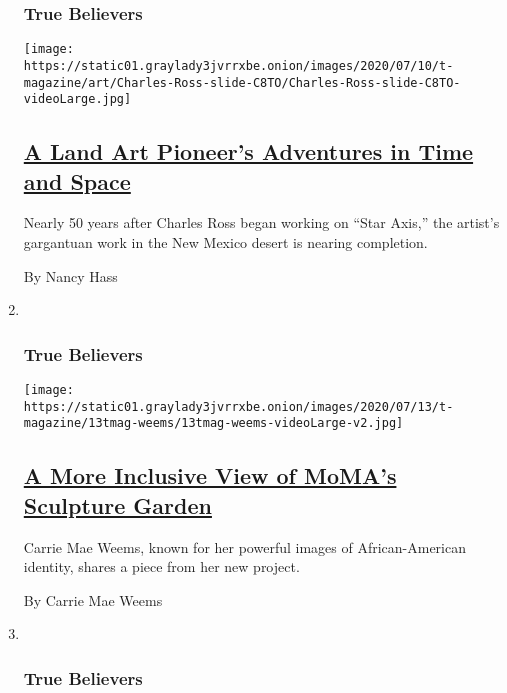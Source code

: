 \begin{enumerate}
{  \subsubsection{True Believers}\label{true-believers-11}}

  \texttt{[image: https://static01.graylady3jvrrxbe.onion/images/2020/07/10/t-magazine/art/Charles-Ross-slide-C8TO/Charles-Ross-slide-C8TO-videoLarge.jpg]}

  \hypertarget{a-land-art-pioneers-adventures-in-time-and-space}{%
  \subsection{\texorpdfstring{\href{/2020/07/21/t-magazine/charles-ross-artist.html}{A
  Land Art Pioneer's Adventures in Time and
  Space}}{A Land Art Pioneer's Adventures in Time and Space}}\label{a-land-art-pioneers-adventures-in-time-and-space}}

  Nearly 50 years after Charles Ross began working on ``Star Axis,'' the
  artist's gargantuan work in the New Mexico desert is nearing
  completion.

  By Nancy Hass
\item ~
  \hypertarget{true-believers-12}{%
  \subsubsection{True Believers}\label{true-believers-12}}

  \texttt{[image: https://static01.graylady3jvrrxbe.onion/images/2020/07/13/t-magazine/13tmag-weems/13tmag-weems-videoLarge-v2.jpg]}

  \hypertarget{a-more-inclusive-view-of-momas-sculpture-garden}{%
  \subsection{\texorpdfstring{\href{/2020/07/21/t-magazine/carrie-mae-weems-moma-garden.html}{A
  More Inclusive View of MoMA's Sculpture
  Garden}}{A More Inclusive View of MoMA's Sculpture Garden}}\label{a-more-inclusive-view-of-momas-sculpture-garden}}

  Carrie Mae Weems, known for her powerful images of African-American
  identity, shares a piece from her new project.

  By Carrie Mae Weems
\item ~
  \hypertarget{true-believers-13}{%
  \subsubsection{True Believers}\label{true-believers-13}}


\end{enumerate}
